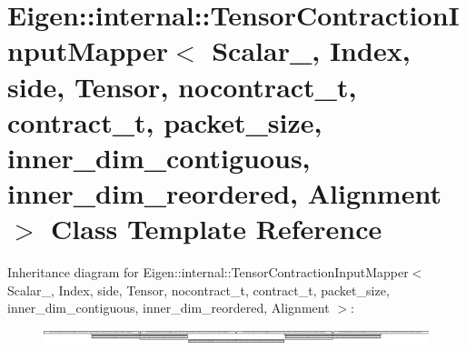 \hypertarget{class_eigen_1_1internal_1_1_tensor_contraction_input_mapper}{}\section{Eigen\+:\+:internal\+:\+:Tensor\+Contraction\+Input\+Mapper$<$ Scalar\+\_\+, Index, side, Tensor, nocontract\+\_\+t, contract\+\_\+t, packet\+\_\+size, inner\+\_\+dim\+\_\+contiguous, inner\+\_\+dim\+\_\+reordered, Alignment $>$ Class Template Reference}
\label{class_eigen_1_1internal_1_1_tensor_contraction_input_mapper}
Inheritance diagram for Eigen\+:\+:internal\+:\+:Tensor\+Contraction\+Input\+Mapper$<$ Scalar\+\_\+, Index, side, Tensor, nocontract\+\_\+t, contract\+\_\+t, packet\+\_\+size, inner\+\_\+dim\+\_\+contiguous, inner\+\_\+dim\+\_\+reordered, Alignment $>$\+:\begin{figure}[H]
\begin{center}
\leavevmode
\includegraphics[height=0.415020cm]{class_eigen_1_1internal_1_1_tensor_contraction_input_mapper}
\end{center}
\end{figure}
